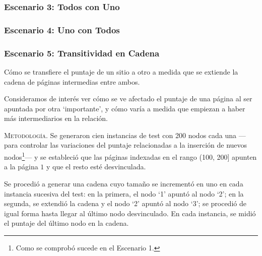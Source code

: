 \vspace{2em}
\subsubsection{Escenario 3: Todos con Uno}




\vspace{2em}
\subsubsection{Escenario 4: Uno con Todos}





\vspace{2em}
\subsubsection{Escenario 5: Transitividad en Cadena} Cómo se transfiere el puntaje de un sitio a otro a medida que se extiende la cadena de páginas intermedias entre ambos.

\vspace{1em}

\vspace{1em}
Consideramos de interés ver cómo se ve afectado el puntaje de una página al ser apuntada por otra `importante', y cómo varía a medida que empiezan a haber más intermediarios en la relación. 

\vspace{1em}
\noindent \textsc{Metodología}. Se generaron cien instancias de test con 200 nodos cada una ---para controlar las variaciones del puntaje relacionadas a la inserción de nuevos nodos\footnote{Como se comprobó sucede en el Escenario 1.}--- y se estableció que las páginas indexadas en el rango (100, 200] apunten a la página $1$ y que el resto esté desvinculada. 

\vspace{1em}

\vspace{1em}
Se procedió a generar una cadena cuyo tamaño se incrementó en uno en cada instancia sucesiva del test: en la primera, el nodo `1' apuntó al nodo `2'; en la segunda, se extendió la cadena y el nodo `2' apuntó al nodo `3'; se procedió de igual forma hasta llegar al último nodo desvinculado. En cada instancia, se midió el puntaje del último nodo en la cadena.

